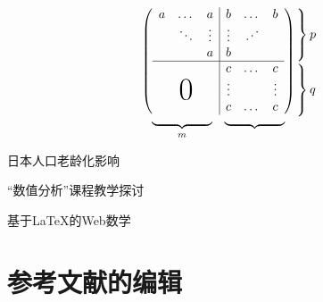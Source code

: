 \documentclass{article}
\newcommand{\adots}{\mathinner{\mkern2mu%
\raisebox{0.1em}{.}\mkern2mu\raisebox{0.4em}{.}%
\mkern2mu\raisebox{0.7em}{.}\mkern1mu}}
\begin{document}
	\[
	\begin{array}{c@{\hspace{-5pt}}l}
		\left(
		\begin{array}{ccc|ccc}
			a & \dots  & a     & b    & \dots & b \\
			  & \ddots & \vdots&\vdots& \adots&   \\
			  &        & a     & b    &       &   \\
			\hline
			  &        &       & c    & \dots & c \\
			  &        &       &\vdots&       &\vdots \\
		  \multicolumn{3}{c|}{\raisebox{2ex}[0pt]{\Huge 0}}
		  &c &\dots &c		  
		\end{array}
		\right)
		&
		\begin{array}{l}
			\left.\rule{0mm}{9mm}\right\}p \\
			\left.\rule{0mm}{9mm}\right\}q
		\end{array}\\[-5pt]
		\begin{array}{cc}
			\underbrace{\rule{17mm}{0mm}}_m&
			\underbrace{\rule{17mm}{0mm}}
		\end{array}
		&	
	\end{array}
	\]


	日本人口老龄化影响\cite{2020}
	
	“数值分析”课程教学探讨\cite{2021}
	
	基于LaTeX的Web数学\cite{2022}
	
	\section[参考文献的编辑]{参考文献的编辑}


	
	
		
		
	


	
	
\end{document}
